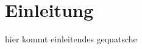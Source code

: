 \chapter{Einleitung}
\begin{Spacing}{\mylinespace}
hier kommt einleitendes gequatsche\\
\end{Spacing}
\newpage
\clearpage
